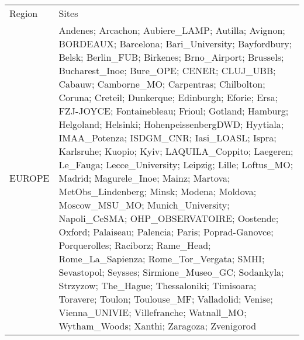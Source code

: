 \begin{table}
 \scriptsize
 \begin{tabularx}{\textwidth}{lX}
  \tophline
  Region    & Sites                                                                                                                                                                                                                                                                                                                                                                                                                                                                                                                                                                                                                                                                                                                                                                                                                                                                                                                                                                                                                                                                                                                                                                                                                                                                                                                                                                                                                                                         \\
  \middlehline
  EUROPE    & Andenes; Arcachon; Aubiere\_LAMP; Autilla; Avignon; BORDEAUX; Barcelona; Bari\_University; Bayfordbury; Belsk; Berlin\_FUB; Birkenes; Brno\_Airport; Brussels; Bucharest\_Inoe; Bure\_OPE; CENER; CLUJ\_UBB; Cabauw; Camborne\_MO; Carpentras; Chilbolton; Coruna; Creteil; Dunkerque; Edinburgh; Eforie; Ersa; FZJ-JOYCE; Fontainebleau; Frioul; Gotland; Hamburg; Helgoland; Helsinki; HohenpeissenbergDWD; Hyytiala; IMAA\_Potenza; ISDGM\_CNR; Iasi\_LOASL; Ispra; Karlsruhe; Kuopio; Kyiv; LAQUILA\_Coppito; Laegeren; Le\_Fauga; Lecce\_University; Leipzig; Lille; Loftus\_MO; Madrid; Magurele\_Inoe; Mainz; Martova; MetObs\_Lindenberg; Minsk; Modena; Moldova; Moscow\_MSU\_MO; Munich\_University; Napoli\_CeSMA; OHP\_OBSERVATOIRE; Oostende; Oxford; Palaiseau; Palencia; Paris; Poprad-Ganovce; Porquerolles; Raciborz; Rame\_Head; Rome\_La\_Sapienza; Rome\_Tor\_Vergata; SMHI; Sevastopol; Seysses; Sirmione\_Museo\_GC; Sodankyla; Strzyzow; The\_Hague; Thessaloniki; Timisoara; Toravere; Toulon; Toulouse\_MF; Valladolid; Venise; Vienna\_UNIVIE; Villefranche; Watnall\_MO; Wytham\_Woods; Xanthi; Zaragoza; Zvenigorod                                                                                                                                                                                                                                                                                                               \\

\end{tabularx}
\end{table}
